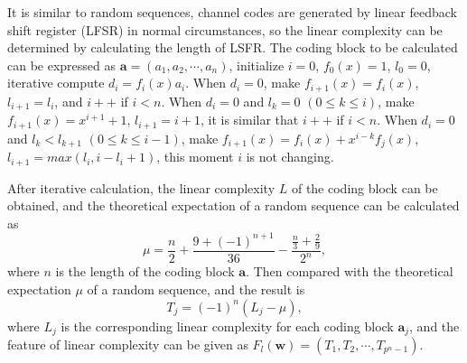 \documentclass[conference]{IEEEtran}
\begin{document}
It is similar to random sequences, channel codes are generated by linear feedback shift register (LFSR) in normal circumstances, so the linear complexity can be determined by calculating the length of LSFR. The coding block to be calculated can be expressed as $\boldsymbol{a} = (a_1, a_2, \cdots, a_{n})$, initialize $i = 0$, $f_0(x) = 1$, $l_0 = 0$, iterative compute $d_i = f_i(x)a_i$. When $d_i = 0$, make $f_{i + 1}(x) = f_i(x)$, $l_{i + 1} = l_i$, and $i++$ if $i < n$. When $d_i = 0$ and $l_k= 0$ $(0 \leq k \leq i)$, make $f_{i + 1}(x) = x^{i + 1} + 1$, $l_{i + 1} = i + 1$, it is similar that $i++$ if $i < n$. When $d_i = 0$ and $l_k < l_{k + 1}$ $(0 \leq k \leq i - 1)$, make $f_{i + 1}(x) = f_i(x) + x^{i - k}f_j(x)$, $l_{i + 1} = max(l_i, i - l_i + 1)$, this moment $i$ is not changing. 

After iterative calculation, the linear complexity $L$ of the coding block can be obtained, and the theoretical expectation of a random sequence can be calculated as
\begin{equation}
	\mu =  \frac n 2 + \frac {9 + (-1)^{n + 1}} {36} - \frac {\frac n 3 + \frac 2 9} {2^n},
\end{equation}
where $n$ is the length of the coding block $\boldsymbol{a}$. Then compared with the theoretical expectation $\mu$ of a random sequence, and the result is
\begin{equation}
	T_j =  (-1)^n(L_j - \mu),
\end{equation}
where $L_j$ is the corresponding linear complexity for each coding block $\boldsymbol{a}_j$, and the feature of linear complexity can be given as $F_l(\boldsymbol{w}) = (T_1, T_2, \cdots, T_{p^n - 1})$.
\end{document}
